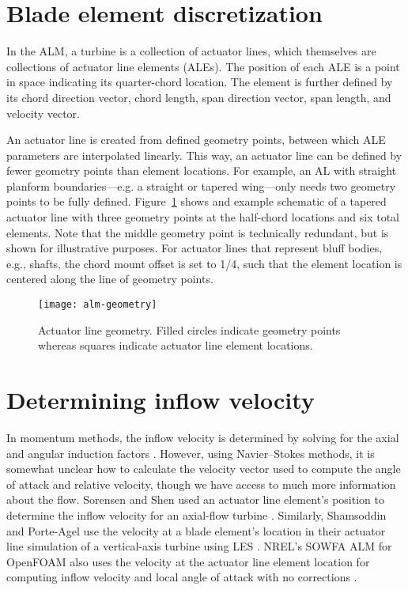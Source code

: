 \section{Blade element discretization}

In the ALM, a turbine is a collection of actuator lines, which themselves are
collections of actuator line elements (ALEs). The position of each ALE is a
point in space indicating its quarter-chord location. The element is further
defined by its chord direction vector, chord length, span direction vector, span
length, and velocity vector.

An actuator line is created from defined geometry points, between which ALE
parameters are interpolated linearly. This way, an actuator line can be defined
by fewer geometry points than element locations. For example, an AL with
straight planform boundaries---e.g. a straight or tapered wing---only needs two
geometry points to be fully defined. Figure~\ref{fig:AL-geom} shows and example
schematic of a tapered actuator line with three geometry points at the
half-chord locations and six total elements. Note that the middle geometry point
is technically redundant, but is shown for illustrative purposes. For actuator
lines that represent bluff bodies, e.g., shafts, the chord mount offset is set
to 1/4, such that the element location is centered along the line of geometry
points.

\begin{figure}
    \centering
    
    \texttt{[image: alm-geometry]}
    
    \caption{Actuator line geometry. Filled circles indicate geometry points
        whereas squares indicate actuator line element locations.}
    
    \label{fig:AL-geom}
\end{figure}


\section{Determining inflow velocity}

In momentum methods, the inflow velocity is determined by solving for the axial
and angular induction factors \cite{Manwell2002}. However, using Navier--Stokes
methods, it is somewhat unclear how to calculate the velocity vector used to
compute the angle of attack and relative velocity, though we have access to much
more information about the flow. Sorensen and Shen used an actuator line
element's position to determine the inflow velocity for an axial-flow turbine
\cite{Sorensen2002}. Similarly, Shamsoddin and Porte-Agel use the velocity at a
blade element's location in their actuator line simulation of a vertical-axis
turbine using LES \cite{Shamsoddin2014}. NREL's SOWFA ALM for OpenFOAM also uses
the velocity at the actuator line element location for computing inflow velocity
and local angle of attack with no corrections \cite{Churchfield2013}.

